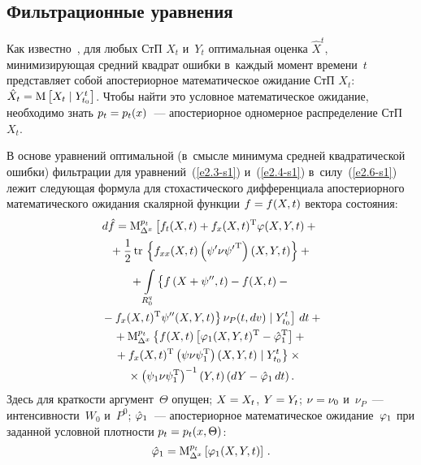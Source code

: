 \begin{multicols}{2}
\subsection{Фильтрационные уравнения}

Как известно~\cite{5-s1, 7-s1, 6-s1}, для любых СтП $X_t$ и~$Y_t$ оптимальная оценка  
$\hat X^t$, минимизирующая средний квадрат ошибки в~каждый момент времени~$t$ 
представляет собой апостериорное математическое ожидание СтП  $X_t$: $\hat X_t \hm= 
\mm \lk X_t \mid Y_{t_0}^t\rk$. Чтобы найти это условное математическое ожидание, 
необходимо знать $p_t \hm= p_t (x)$~--- апостериорное одномерное распределение 
СтП~$X_t$.

В основе уравнений оптимальной (в~смыс\-ле минимума средней квадратической ошибки) 
фильт\-рации для уравнений~(\ref{e2.3-s1}) и~(\ref{e2.4-s1}) в~силу~(\ref{e2.6-s1}) 
лежит следу\-ющая формула для стохастического дифференциала апостериорного математического 
ожидания скалярной функции  $f\hm=f(X,t)$ вектора состояния:
\begin{multline}
d \hat f = \mm_{\Delta^x}^{p_t} \left[ 
f_t (X,t) + f_x (X,t)^{\mathrm{T}} \vrp (X,Y,t) + {}\right.\\
{}+\fr{1}{2}\,\mathrm{tr}\, 
\lf f_{xx} (X,t) \left(\psi' \nu {\psi'}^{\mathrm{T}}\right) (X,Y,t)\rf+{}\\
{}+ \iii_{R_0^q}  \left\{  \vphantom{f_x (X,t)^{\mathrm{T}}}
f \left(X+ \psi'' , t\right) - f(X,t) -{}\right.\\
\left.\left.{}- f_x (X,t)^{\mathrm{T}} 
\psi''(X,Y,t)\right\} \nu_P (t, dv)\mid Y_{t_0}^t \right]\, dt+{}\\
{}+\mm_{\Delta^x}^{p_t} \left\{ f(X,t) \left[ \vrp_1 (X,Y,t)^{\mathrm{T}} -
\hat \vrp_1^{\mathrm{T}}\right] +{}\right.\\
\hspace*{-2mm}\left.{}+ f_x (X,t)^{\mathrm{T}} \left(\psi\nu\psi_1^{\mathrm{T}}\right) 
(X,Y,t) \mid Y_{t_0}^t\right\} \times{}\\
    {}\times \left(\psi_1 \nu \psi_1^{\mathrm{T}}\right)^{-1} (Y,t) 
    \left(dY-\hat\vrp_1\, dt\right).
    \label{e2.7-s1}
    \end{multline}
Здесь для краткости аргумент~$\Theta$ опущен; $X\hm=X_t$, $ Y\hm=Y_t$; $\nu\hm=\nu_0$ 
и~$\nu_P $~--- интенсивности~$W_0$ и~$P^0$;
$\hat{\varphi}_1$~--- апостериорное математическое ожидание~$\varphi_1$ при заданной условной 
плотности  $p_t\hm=p_t (x, \Theta)$:
\begin{equation*}
\hat\vrp_1 = \mm_{\Delta^x}^{p_t} \lk\vrp_1(X,Y,t)\rk\,. %
\end{equation*}


\end{multicols}
